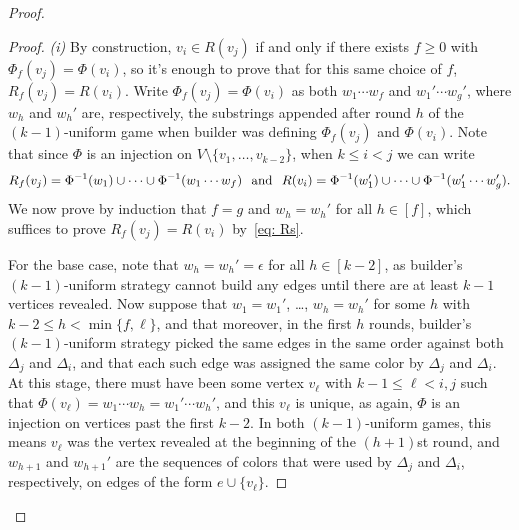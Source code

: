 \documentclass[A4paper,reqno,oneside,12pt]{amsart}
\theoremstyle{plain}
\theoremstyle{definition}
\def\l{\ell}
\def\e{\epsilon}
\begin{document}
\begin{proof}
\begin{proof}
    {\it (i)}
    By construction, $v_i \in R(v_j)$ if and only if there exists $f \geq 0$ with $\Phi_f(v_j) = \Phi(v_i)$, so it's enough to prove that for this same choice of $f$, $R_f(v_j) = R(v_i)$.
    Write $\Phi_f(v_j) = \Phi(v_i)$ as both $w_1 \cdots w_f$ and $w_1' \cdots w_g'$, where $w_h$ and $w_h'$ are, respectively, the substrings appended after round $h$ of the $(k-1)$-uniform game when builder was defining $\Phi_f(v_j)$ and $\Phi(v_i)$.
    Note that since $\Phi$ is an injection on $V \setminus \{v_1, \dots, v_{k-2}\}$, when $k \leq i < j$ we can write
    \begin{equation}
    \label{eq: Rs}
        R_f(v_j) = \Phi^{-1}(w_1) \cup \dots \cup \Phi^{-1}(w_1 \cdots w_f)
        \hspace{0.25cm}
        \text{and}
        \hspace{0.25cm}
        R(v_i) = \Phi^{-1}(w_1') \cup \dots \cup \Phi^{-1}(w_1' \cdots w_g').
    \end{equation}
    We now prove by induction that $f = g$ and $w_h = w_h'$ for all $h \in [f]$, which suffices to prove $R_f(v_j) = R(v_i)$ by~\eqref{eq: Rs}.

    For the base case, note that $w_h = w_h' = \e$ for all $h \in [k-2]$, as builder's $(k-1)$-uniform strategy cannot build any edges until there are at least $k-1$ vertices revealed.
    Now suppose that $w_1 = w_1'$, \dots, $w_h = w_h'$ for some $h$ with $k-2 \leq h < \min\{f,\l\}$, and that moreover, in the first $h$ rounds, builder's $(k-1)$-uniform strategy picked the same edges in the same order against both $\Delta_j$ and $\Delta_i$, and that each such edge was assigned the same color by $\Delta_j$ and $\Delta_i$.
    At this stage, there must have been some vertex $v_\l$ with $k-1 \leq \l < i, j$ such that $\Phi(v_\l) = w_1 \cdots w_h = w_1' \cdots w_h'$, and this $v_\l$ is unique, as again, $\Phi$ is an injection on vertices past the first $k-2$.
    In both $(k-1)$-uniform games, this means $v_\l$ was the vertex revealed at the beginning of the $(h+1)$st round, and $w_{h+1}$ and $w_{h+1}'$ are the sequences of colors that were used by $\Delta_j$ and $\Delta_i$, respectively, on edges of the form $e \cup \{v_\l\}$.


\end{proof}
\end{proof}
\end{document}
